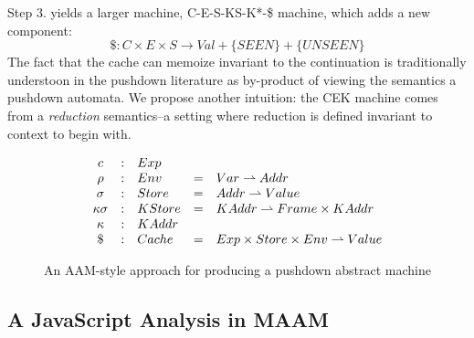 \documentclass[10pt,letter,english]{article}
\newcommand{\partto}{\rightharpoonup}
\newcommand{\cek}[3]{\langle #1, #2, #3 \rangle}
\newcommand{\cesk}[4]{\langle #1, #2, #3, #4 \rangle}
\newcommand{\cessk}[5]{\langle #1, #2, #3, #4, #5 \rangle}
\newcommand{\cesskc}[6]{\langle #1, #2, #3, #4, #5, #6 \rangle}
\begin{document}
Step 3. yields a larger machine, C-E-S-KS-K*-\$ machine, which adds a new component:
\begin{equation*}
\$ : C \times E \times S \rightarrow Val + \{SEEN\} + \{UNSEEN\}
\end{equation*}
%
The fact that the cache can memoize invariant to the continuation is
traditionally understoon in the pushdown literature as by-product of viewing
the semantics a pushdown automata.
%
We propose another intuition: the CEK machine comes from a \emph{reduction}
semantics--a setting where reduction is defined invariant to context to begin
with.

\begin{figure}
\centering

\begin{equation*}
\begin{array}{c c l c l}
  c            &:& Exp        && \\
  \rho         &:& Env        &=& Var   \partto Addr \\
  \sigma       &:& Store      &=& Addr  \partto Value \\
  \kappa\sigma &:& KStore     &=& KAddr \partto Frame \times KAddr \\
  \kappa       &:& KAddr      && \\
  \$         &:& Cache      &=& Exp \times Store \times Env \partto Value
\end{array}
\end{equation*}


\caption{An AAM-style approach for producing a pushdown abstract machine} \label{fig:M1}
\end{figure}

\subsection{A JavaScript Analysis in MAAM}
\end{document}
